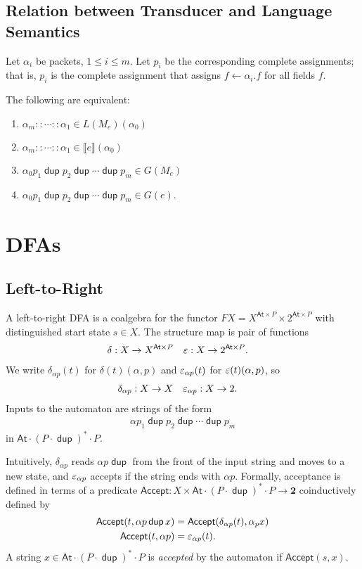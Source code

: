 \documentclass{article}
\newcommand\den[1]{\llbracket #1\rrbracket}
\newcommand\At{\ensuremath{\mathsf{At}}}
\newcommand\pdup{\mathop{\mathsf{dup}}}
\newcommand\Two{\mathbf{2}}
\renewcommand\star{^{\textstyle *}}
\newcommand\acc{\mathsf{Accept}}
\begin{document}
\subsection*{Relation between Transducer and Language Semantics}

Let $\alpha_i$ be packets, $1\leq i\leq m$. Let $p_i$ be the corresponding complete assignments; that is, $p_i$ is the complete assignment that assigns $f\leftarrow\alpha_i.f$ for all fields $f$.

\begin{theorem}
The following are equivalent:
\begin{enumerate}
\romanize
\item
$\alpha_m::\cdots::\alpha_1 \in L(M_e)(\alpha_0)$
\item
$\alpha_m::\cdots::\alpha_1 \in \den{e}(\alpha_0)$
\item
$\alpha_0 p_1 \pdup p_2 \pdup \cdots \pdup p_m \in G(M_e)$
\item
$\alpha_0 p_1 \pdup p_2 \pdup \cdots \pdup p_m \in G(e)$.
\end{enumerate}
\end{theorem}

\section*{DFAs}

\subsection*{Left-to-Right}

A left-to-right DFA is a coalgebra for the functor $FX = X^{\At\times P}\times 2^{\At\times P}$ with distinguished start state $s\in X$. The structure map is pair of functions
\begin{align*}
\delta &: X\to X^{\At\times P} & \eps &: X\to 2^{\At\times P}.
\end{align*}
We write $\delta_{\alpha p}(t)$ for $\delta(t)(\alpha,p)$ and $\varepsilon_{\alpha p}(t)$ for $\varepsilon(t)(\alpha,p)$, so
\begin{align*}
\delta_{\alpha p} &: X\to X & \varepsilon_{\alpha p} &: X\to 2.
\end{align*}
Inputs to the automaton are strings of the form
\begin{align*}
\alpha p_1\pdup p_2\pdup\cdots\pdup p_m
\end{align*}
in $\At\cdot(P\cdot\pdup)\star\cdot P$.

Intuitively, $\delta_{\alpha p}$ reads $\alpha p\pdup$ from the front of the input string and moves to a new state, and $\varepsilon_{\alpha p}$ accepts if the string ends with $\alpha p$. Formally, acceptance is defined in terms of a predicate $\acc:X\times\At\cdot(P\cdot\pdup)\star\cdot P\to\Two$ coinductively defined by
\begin{align*}
\acc(t,\alpha p\pdup x) &= \acc(\delta_{\alpha p}(t),\alpha_p x)\\
\acc(t,\alpha p) &= \eps_{\alpha p}(t).
\end{align*}
A string $x\in\At\cdot(P\cdot\pdup)\star\cdot P$ is \emph{accepted} by the automaton if $\acc(s,x)$.
\end{document}
